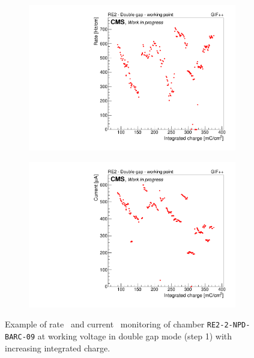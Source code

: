 	\begin{figure}[H]
    	\begin{subfigure}{0.5\linewidth}
			\centering
    		\includegraphics[width = 0.5\plotwidth]{fig/chapt5/GIFpp-Rate-vs-Q.pdf}
        	\caption{\label{fig:rate-I-monitor:A}}
    	\end{subfigure}
    	\begin{subfigure}{0.5\linewidth}
			\centering
    		\includegraphics[width = 0.5\plotwidth]{fig/chapt5/GIFpp-I-vs-Q.pdf}
        	\caption{\label{fig:rate-I-monitor:B}}
    	\end{subfigure}
		\caption{\label{fig:rate-I-monitor} Example of rate~ and current~ monitoring of chamber \texttt{RE2-2-NPD-BARC-09} at working voltage in double gap mode (step 1) with increasing integrated charge.}
	\end{figure}

